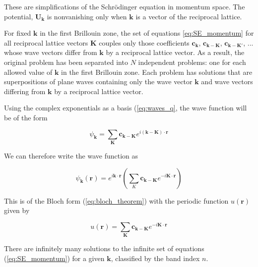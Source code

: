 	These are simplifications of the Schrödinger equation in momentum space.  The potential, $\boldsymbol{U}_\mathbf{k}$ is nonvanishing only when $\boldsymbol{k}$ is a vector of the reciprocal lattice.

	For fixed $\mathbf{k}$ in the first Brillouin zone, the set of equations \ref{eq:SE_momentum} for all reciprocal lattice vectors $\mathbf{K}$ couples only those coefficients $\boldsymbol{c}_\mathbf{k}$, $\boldsymbol{c}_\mathbf{k-K}$, $\boldsymbol{c}_\mathbf{k-K'}$, ... whose wave vectors differ from $\mathbf{k}$ by a reciprocal lattice vector. As a result, the original problem has been separated into $N$ independent problems: one for each allowed value of $\mathbf{k}$ in the first Brillouin zone. Each problem has solutions that are superpositions of plane waves containing only the wave vector $\mathbf{k}$ and wave vectors differing from $\mathbf{k}$ by a reciprocal lattice vector. 

	Using the complex exponentials as a basis (\ref{eq:waves_q}, the wave function will be of the form

	\begin{equation} \label{eq:waves_k}
		\psi_{\mathbf{k}}
		= \sum_{\boldsymbol{K}}
		\boldsymbol{c}_{\mathbf{k-K}}
		e^{i(\mathbf{k-K}) \cdot \mathbf{r}}
	\end{equation}

	We can therefore write the wave function as 

	\begin{equation} \label{eq:psi_proof}
		\psi_{\mathbf{k}}(\mathbf{r})
		= e^{i\mathbf{k} \cdot \mathbf{r}}
		\left(\sum_{K} \boldsymbol{c}_{\mathbf{k-K}}
		e^{-i\mathbf{K\cdot r}}
		\right)
	\end{equation}

	This is of the Bloch form (\ref{eq:bloch_theorem}) with the periodic function $u(\mathbf{r})$ given by

	\begin{equation} \label{eq:u_r}
		u(\mathbf{r}) = 
		\sum_{\mathbf{K}} 
		\boldsymbol{c}_{\mathbf{k-K}}
		e^{-i\mathbf{K \cdot r}}
	\end{equation}

	There are infinitely many solutions to the infinite set of equations (\ref{eq:SE_momentum}) for a given $\mathbf{k}$, classified by the band index $n$.

